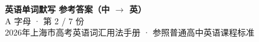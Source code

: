 \documentclass[10pt,a4paper]{article}
\begin{document}
\pagestyle{plain}

\begin{center}
{\LARGE\bfseries 英语单词默写 \quad 参考答案（中 $\to$ 英）}\\[0.22em]
{\large A 字母 · 第 2 / 7 份}\\[0.18em]
{\small 2026年上海市高考英语词汇用法手册 · 参照普通高中英语课程标准}
\end{center}

\vspace{0.2em}
\noindent{\color{rulegray}\rule{\textwidth}{0.8pt}}

\vspace{0.35em}

\vspace{0.25em}
\renewcommand{\arraystretch}{1.32}
\end{document}
